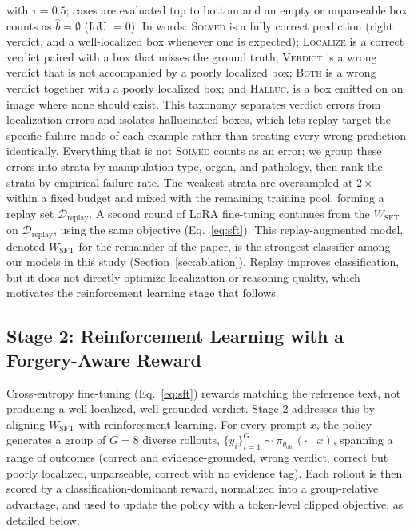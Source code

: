 \documentclass[10pt,twocolumn,letterpaper]{article}
\begin{document}
with $\tau = 0.5$; cases are evaluated top to bottom and an empty or unparseable box counts as $\hat b = \emptyset$ (IoU $=0$). In words: \textsc{Solved} is a fully correct prediction (right verdict, and a well-localized box whenever one is expected); \textsc{Localize} is a correct verdict paired with a box that misses the ground truth; \textsc{Verdict} is a wrong verdict that is not accompanied by a poorly localized box; \textsc{Both} is a wrong verdict together with a poorly localized box; and \textsc{Halluc.} is a box emitted on an image where none should exist. This taxonomy separates verdict errors from localization errors and isolates hallucinated boxes, which lets replay target the specific failure mode of each example rather than treating every wrong prediction identically. Everything that is not \textsc{Solved} counts as an error; we group these errors into strata by manipulation type, organ, and pathology, then rank the strata by empirical failure rate. The weakest strata are oversampled at $2\times$ within a fixed budget and mixed with the remaining training pool, forming a replay set $\mathcal{D}_{\mathrm{replay}}$. A second round of LoRA fine-tuning continues from the $W_{\mathrm{SFT}}$ on $\mathcal{D}_{\mathrm{replay}}$, using the same objective (Eq.~\ref{eq:sft}). This replay-augmented model, denoted $W_{\mathrm{SFT}}$ for the remainder of the paper, is the strongest classifier among our models in this study (Section~\ref{sec:ablation}). Replay improves classification, but it does not directly optimize localization or reasoning quality, which motivates the reinforcement learning stage that follows.

\subsection{Stage 2: Reinforcement Learning with a Forgery-Aware Reward}
\label{sec:stage2}
Cross-entropy fine-tuning (Eq.~\ref{eq:sft}) rewards matching the reference text, not producing a well-localized, well-grounded verdict. Stage 2 addresses this by aligning $W_{\mathrm{SFT}}$ with reinforcement learning. For every prompt $x$, the policy generates a group of $G{=}8$ diverse rollouts, $\{y_i\}_{i=1}^G \sim \pi_{\theta_{\mathrm{old}}}(\cdot\mid x)$, spanning a range of outcomes (correct and evidence-grounded, wrong verdict, correct but poorly localized, unparseable, correct with no evidence tag). Each rollout is then scored by a classification-dominant reward, normalized into a group-relative advantage, and used to update the policy with a token-level clipped objective, as detailed below.
\end{document}
